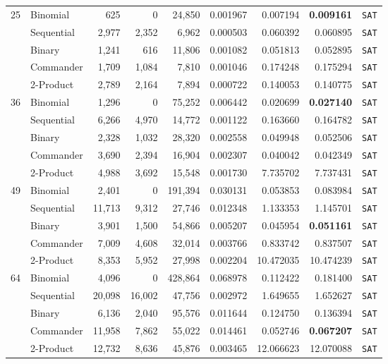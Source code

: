 \documentclass[a4paper,fleqn]{cas-sc}
\begin{document}
\begin{table}[t]
\begin{tabular*}{\textwidth}{@{\extracolsep{\fill}} r l r r r r r r c @{}}
\midrule
\multirow{5}{*}{25} 
 & Binomial & 625 & 0 & 24,850 & 0.001967 & 0.007194 & \textbf{0.009161} & \texttt{SAT} \\
 & Sequential & 2,977 & 2,352 & 6,962 & 0.000503 & 0.060392 & 0.060895 & \texttt{SAT} \\
 & Binary & 1,241 & 616 & 11,806 & 0.001082 & 0.051813 & 0.052895 & \texttt{SAT} \\
 & Commander & 1,709 & 1,084 & 7,810 & 0.001046 & 0.174248 & 0.175294 & \texttt{SAT} \\
 & 2-Product & 2,789 & 2,164 & 7,894 & 0.000722 & 0.140053 & 0.140775 & \texttt{SAT} \\
\midrule
\multirow{5}{*}{36} 
 & Binomial & 1,296 & 0 & 75,252 & 0.006442 & 0.020699 & \textbf{0.027140} & \texttt{SAT} \\
 & Sequential & 6,266 & 4,970 & 14,772 & 0.001122 & 0.163660 & 0.164782 & \texttt{SAT} \\
 & Binary & 2,328 & 1,032 & 28,320 & 0.002558 & 0.049948 & 0.052506 & \texttt{SAT} \\
 & Commander & 3,690 & 2,394 & 16,904 & 0.002307 & 0.040042 & 0.042349 & \texttt{SAT} \\
 & 2-Product & 4,988 & 3,692 & 15,548 & 0.001730 & 7.735702 & 7.737431 & \texttt{SAT} \\
\midrule
\multirow{5}{*}{49} 
 & Binomial & 2,401 & 0 & 191,394 & 0.030131 & 0.053853 & 0.083984 & \texttt{SAT} \\
 & Sequential & 11,713 & 9,312 & 27,746 & 0.012348 & 1.133353 & 1.145701 & \texttt{SAT} \\
 & Binary & 3,901 & 1,500 & 54,866 & 0.005207 & 0.045954 & \textbf{0.051161} & \texttt{SAT} \\
 & Commander & 7,009 & 4,608 & 32,014 & 0.003766 & 0.833742 & 0.837507 & \texttt{SAT} \\
 & 2-Product & 8,353 & 5,952 & 27,998 & 0.002204 & 10.472035 & 10.474239 & \texttt{SAT} \\
\midrule
\multirow{5}{*}{64} 
 & Binomial & 4,096 & 0 & 428,864 & 0.068978 & 0.112422 & 0.181400 & \texttt{SAT} \\
 & Sequential & 20,098 & 16,002 & 47,756 & 0.002972 & 1.649655 & 1.652627 & \texttt{SAT} \\
 & Binary & 6,136 & 2,040 & 95,576 & 0.011644 & 0.124750 & 0.136394 & \texttt{SAT} \\
 & Commander & 11,958 & 7,862 & 55,022 & 0.014461 & 0.052746 & \textbf{0.067207} & \texttt{SAT} \\
 & 2-Product & 12,732 & 8,636 & 45,876 & 0.003465 & 12.066623 & 12.070088 & \texttt{SAT} \\

\end{tabular*}
\end{table}
\end{document}
